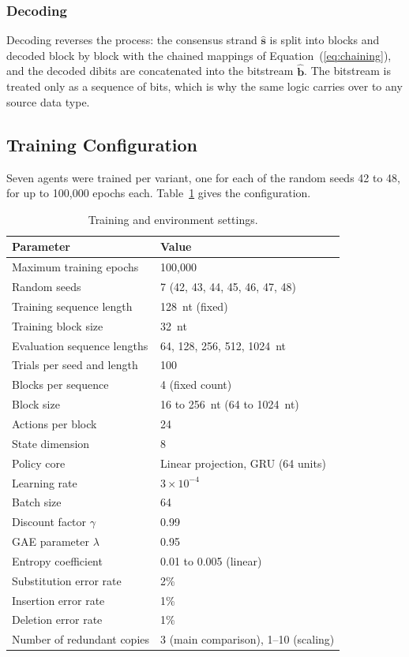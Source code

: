 \documentclass[entropy,article,submit,moreauthors]{Definitions/mdpi}
\begin{document}
\subsubsection{Decoding}

Decoding reverses the process: the consensus strand $\hat{\mathbf{s}}$ is split into blocks and decoded block by block with the chained mappings of Equation~(\ref{eq:chaining}), and the decoded dibits are concatenated into the bitstream $\hat{\mathbf{b}}$. The bitstream is treated only as a sequence of bits, which is why the same logic carries over to any source data type.

\subsection{Training Configuration}
\label{sec:experimental_setup}

Seven agents were trained per variant, one for each of the random seeds 42 to 48, for up to 100{,}000 epochs each. Table~\ref{tab:hyperparams} gives the configuration.

\begin{table}[H]
\caption{Training and environment settings.\label{tab:hyperparams}}
\footnotesize
\begin{tabularx}{\textwidth}{@{}lX@{}}
\toprule
\textbf{Parameter} & \textbf{Value} \\
\midrule
Maximum training epochs     & 100{,}000 \\
Random seeds                & 7 (42, 43, 44, 45, 46, 47, 48) \\
Training sequence length    & 128~nt (fixed) \\
Training block size         & 32~nt \\
Evaluation sequence lengths & 64, 128, 256, 512, 1024~nt \\
Trials per seed and length   & 100 \\
Blocks per sequence         & 4 (fixed count) \\
Block size                  & 16 to 256~nt (64 to 1024~nt) \\
Actions per block           & 24 \\
State dimension             & 8 \\
Policy core                 & Linear projection, GRU (64 units) \\
Learning rate               & $3 \times 10^{-4}$ \\
Batch size                  & 64 \\
Discount factor $\gamma$    & 0.99 \\
GAE parameter $\lambda$     & 0.95 \\
Entropy coefficient         & 0.01 to 0.005 (linear) \\
\midrule
Substitution error rate     & 2\% \\
Insertion error rate        & 1\% \\
Deletion error rate         & 1\% \\
Number of redundant copies  & 3 (main comparison), 1--10 (scaling) \\
\bottomrule
\end{tabularx}
\end{table}
\end{document}
